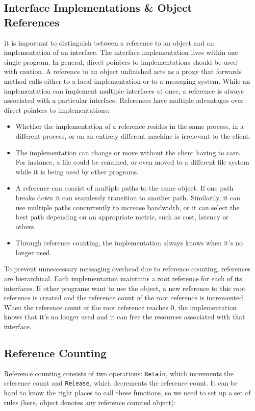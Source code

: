 \documentclass[a4paper]{article}
\begin{document}
\subsection{Interface Implementations \& Object References}
It is important to distinguish between a reference to an object and an implementation of an interface. The interface implementation lives within one single program. In general, direct pointers to implementations should be used with caution. A reference to an object {\q unfinished} acts as a proxy that forwards method calls either to a local implementation or to a messaging system. While an implementation can implement multiple interfaces at once, a reference is always associated with a particular interface. References have multiple advantages over direct pointers to implementations:

\begin{itemize}
  \item Whether the implementation of a reference resides in the same process, in a different process, or on an entirely different machine is irrelevant to the client.
  \item The implementation can change or move without the client having to care. For instance, a file could be renamed, or even moved to a different file system while it is being used by other programs.
  \item A reference can consist of multiple paths to the same object. If one path breaks down it can seamlessly transition to another path. Similarily, it can use multiple paths concurrently to increase bandwidth, or it can select the best path depending on an appropriate metric, such as cost, latency or others.
  \item Through reference counting, the implementation always knows when it's no longer used.
\end{itemize}

To prevent unneccessary messaging overhead due to reference counting, references are hierarchical. Each implementation maintains a root reference for each of its interfaces. If other programs want to use the object, a new reference to this root reference is created and the reference count of the root reference is incremented. When the reference count of the root reference reaches 0, the implementation knows that it's no longer used and it can free the resources associated with that interface.

\subsection{Reference Counting}
Reference counting consists of two operations: {\tt Retain}, which increments the reference count and {\tt Release}, which decrements the reference count.
It can be hard to know the right places to call these functions, so we need to set up a set of rules (here, object denotes any reference counted object):
\end{document}

